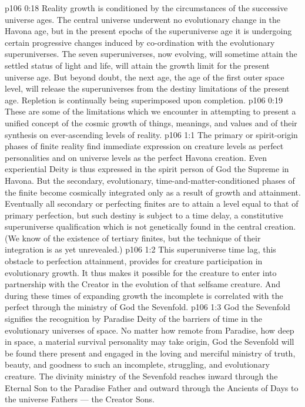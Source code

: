 \vs p106 0:18 \pc Reality growth is conditioned by the circumstances of the successive universe ages. The central universe underwent no evolutionary change in the Havona age, but in the present epochs of the superuniverse age it is undergoing certain progressive changes induced by co\hyp{}ordination with the evolutionary superuniverses. The seven superuniverses, now evolving, will sometime attain the settled status of light and life, will attain the growth limit for the present universe age. But beyond doubt, the next age, the age of the first outer space level, will release the superuniverses from the destiny limitations of the present age. Repletion is continually being superimposed upon completion.
\vs p106 0:19 \pc These are some of the limitations which we encounter in attempting to present a unified concept of the cosmic growth of things, meanings, and values and of their synthesis on ever\hyp{}ascending levels of reality.
\vs p106 1:1 The primary or spirit\hyp{}origin phases of finite reality find immediate expression on creature levels as perfect personalities and on universe levels as the perfect Havona creation. Even experiential Deity is thus expressed in the spirit person of God the Supreme in Havona. But the secondary, evolutionary, time\hyp{}and\hyp{}matter\hyp{}conditioned phases of the finite become cosmically integrated only as a result of growth and attainment. Eventually all secondary or perfecting finites are to attain a level equal to that of primary perfection, but such destiny is subject to a time delay, a constitutive superuniverse qualification which is not genetically found in the central creation. (We know of the existence of tertiary finites, but the technique of their integration is as yet unrevealed.)
\vs p106 1:2 This superuniverse time lag, this obstacle to perfection attainment, provides for creature participation in evolutionary growth. It thus makes it possible for the creature to enter into partnership with the Creator in the evolution of that selfsame creature. And during these times of expanding growth the incomplete is correlated with the perfect through the ministry of God the Sevenfold.
\vs p106 1:3 God the Sevenfold signifies the recognition by Paradise Deity of the barriers of time in the evolutionary universes of space. No matter how remote from Paradise, how deep in space, a material survival personality may take origin, God the Sevenfold will be found there present and engaged in the loving and merciful ministry of truth, beauty, and goodness to such an incomplete, struggling, and evolutionary creature. The divinity ministry of the Sevenfold reaches inward through the Eternal Son to the Paradise Father and outward through the Ancients of Days to the universe Fathers --- the Creator Sons.

